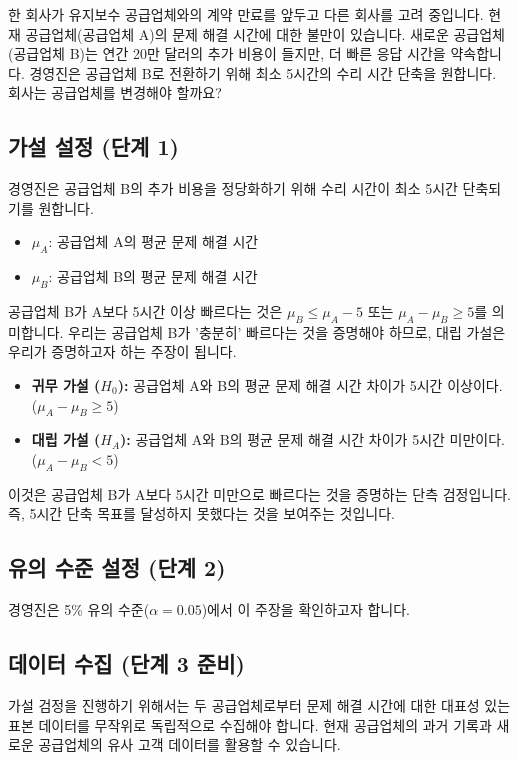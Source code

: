 \documentclass[11pt,a4paper]{book}
\theoremstyle{definition}
\begin{document}
\begin{examplebox}[title=시나리오: 유지보수 공급업체 변경 고려]
한 회사가 유지보수 공급업체와의 계약 만료를 앞두고 다른 회사를 고려 중입니다. 현재 공급업체(공급업체 A)의 문제 해결 시간에 대한 불만이 있습니다. 새로운 공급업체(공급업체 B)는 연간 20만 달러의 추가 비용이 들지만, 더 빠른 응답 시간을 약속합니다. 경영진은 공급업체 B로 전환하기 위해 최소 5시간의 수리 시간 단축을 원합니다. 회사는 공급업체를 변경해야 할까요?
\end{examplebox}

\subsection{가설 설정 (단계 1)}
경영진은 공급업체 B의 추가 비용을 정당화하기 위해 수리 시간이 최소 5시간 단축되기를 원합니다.
\begin{itemize}
    \item $\mu_A$: 공급업체 A의 평균 문제 해결 시간
    \item $\mu_B$: 공급업체 B의 평균 문제 해결 시간
\end{itemize}
공급업체 B가 A보다 5시간 이상 빠르다는 것은 $\mu_B \le \mu_A - 5$ 또는 $\mu_A - \mu_B \ge 5$를 의미합니다.
우리는 공급업체 B가 '충분히' 빠르다는 것을 증명해야 하므로, 대립 가설은 우리가 증명하고자 하는 주장이 됩니다.

\begin{itemize}
    \item \textbf{귀무 가설 ($H_0$):} 공급업체 A와 B의 평균 문제 해결 시간 차이가 5시간 이상이다.
    ($\mu_A - \mu_B \ge 5$)
    \item \textbf{대립 가설 ($H_A$):} 공급업체 A와 B의 평균 문제 해결 시간 차이가 5시간 미만이다.
    ($\mu_A - \mu_B < 5$)
\end{itemize}
이것은 공급업체 B가 A보다 5시간 미만으로 빠르다는 것을 증명하는 단측 검정입니다. 즉, 5시간 단축 목표를 달성하지 못했다는 것을 보여주는 것입니다.

\subsection{유의 수준 설정 (단계 2)}
경영진은 5\% 유의 수준($\alpha = 0.05$)에서 이 주장을 확인하고자 합니다.

\subsection{데이터 수집 (단계 3 준비)}
가설 검정을 진행하기 위해서는 두 공급업체로부터 문제 해결 시간에 대한 대표성 있는 표본 데이터를 무작위로 독립적으로 수집해야 합니다. 현재 공급업체의 과거 기록과 새로운 공급업체의 유사 고객 데이터를 활용할 수 있습니다.
\end{document}
